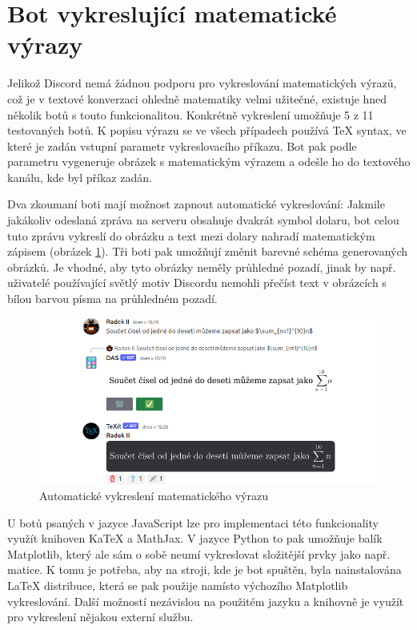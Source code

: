\documentclass[FM]{tulthesis}
\begin{document}
	\section{Bot vykreslující matematické výrazy}\label{_tag_section_texbot}

	Jelikož Discord nemá žádnou podporu pro vykreslování matematických výrazů, což je v textové konverzaci ohledně matematiky velmi užitečné, existuje hned několik botů s touto funkcionalitou. Konkrétně vykreslení umožňuje 5 z 11 testovaných botů. K popisu výrazu se ve všech případech používá TeX syntax, ve které je zadán vstupní parametr vykreslovacího příkazu. Bot pak podle parametru vygeneruje obrázek s matematickým výrazem a odešle ho do textového kanálu, kde byl příkaz zadán.
	
	Dva zkoumaní boti mají možnost zapnout automatické vykreslování: Jakmile jakákoliv odeslaná zpráva na serveru obsahuje dvakrát symbol dolaru, bot celou tuto zprávu vykreslí do obrázku a text mezi dolary nahradí matematickým zápisem (obrázek \ref{_tag_img_autotex}). Tři boti pak umožňují změnit barevné schéma generovaných obrázků. Je vhodné, aby tyto obrázky neměly průhledné pozadí, jinak by např. uživatelé používající světlý motiv Discordu nemohli přečíst text v obrázcích s bílou barvou písma na průhledném pozadí.
	
	\begin{figure}[ht]
		\centering
		\includegraphics[width=\textwidth]{img/AutoTeX}
		\caption{Automatické vykreslení matematického výrazu}
		\label{_tag_img_autotex}
	\end{figure}
	
	U botů psaných v jazyce JavaScript lze pro implementaci této funkcionality využít knihoven KaTeX a MathJax. V jazyce Python to pak umožňuje balík Matplotlib, který ale sám o sobě neumí vykreslovat složitější prvky jako např. matice. K tomu je potřeba, aby na stroji, kde je bot spuštěn, byla nainstalována LaTeX distribuce, která se pak použije namísto výchozího Matplotlib vykreslování. Další možností nezávislou na použitém jazyku a knihovně je využít pro vykreslení nějakou externí službu.
	
\end{document}
